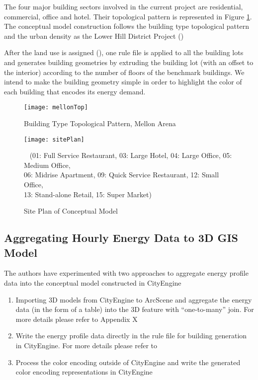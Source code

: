The four major building sectors involved in the current project are
residential, commercial, office and hotel. Their topological pattern
is represented in Figure \ref{fig:mellonTop}. The conceptual model
construction follows the building type topological pattern and the
urban density as the Lower Hill District Project ()

After the land use is assigned (), one rule file is
applied to all the building lots and generates building geometries by
extruding the building lot (with an offset to the interior) according
to the number of floors of the benchmark buildings. We intend to make
the building geometry simple in order to highlight the color of each
building that encodes its energy demand.

\begin{figure}[h!]
  \centering
  \texttt{[image: mellonTop]}
  \caption[Building Type Topology]{Building Type Topological Pattern, Mellon Arena}
  \label{fig:mellonTop}
\end{figure}

\begin{figure}[h!]
  \centering
  \texttt{[image: sitePlan]}
  \caption[Conceptual Model Site Plan]{Site Plan of Conceptual Model}~ (01: Full Service
  Restaurant, 03: Large Hotel, 04: Large Office, 05: Medium Office,
  \\06: Midrise Apartment, 09: Quick Service Restaurant, 12: Small
  Office, \\13: Stand-alone Retail, 15: Super Market)
  \label{fig:sitePlan}
\end{figure}

\subsection{Aggregating Hourly Energy Data to 3D GIS Model}\label{sec:aggregateTime}
The authors have experimented with two approaches to aggregate energy
profile data into the conceptual model constructed in CityEngine
\begin{enumerate}[1)]
\item Importing 3D models from CityEngine to ArcScene and aggregate
  the energy data (in the form of a table) into the 3D feature with
  ``one-to-many'' join. For more details please refer to Appendix X

\item Write the energy profile data directly in the rule file for
  building generation in CityEngine. For more details please refer to

\item Process the color encoding outside of CityEngine and write the
  generated color encoding representations in CityEngine
\end{enumerate}

